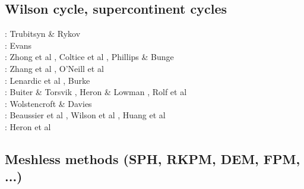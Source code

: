 \subsection{Wilson cycle, supercontinent cycles}

\begin{scriptsize}
\nineteenninetyfive: Trubitsyn \& Rykov \cite{trry95}\\
\twothousandthree: Evans \cite{evan03}\\
\twothousandseven: Zhong et al \cite{zhzl07}, Coltice et al \cite{copb07}, Phillips \& Bunge \cite{phbu07}\\
\twothousandnine: Zhang et al \cite{zhzm09}, O'Neill et al \cite{onlj09}\\
\twothousandeleven: Lenardic et al \cite{lemj11}, Burke \cite{burk11}\\
\twothousandfourteen: Buiter \& Torsvik \cite{buto14}, Heron \& Lowman \cite{helo14}, Rolf et al \cite{roct14}\\
\twothousandseventeen: Wolstencroft \& Davies \cite{woda17}\\
\twothousandnineteen: Beaussier et al \cite{begb19}, Wilson et al \cite{wihb19}, Huang et al \cite{huzl19}\\
\twothousandtwenty: Heron et al \cite{hemn20}
\end{scriptsize}

\subsection{Meshless methods (SPH, RKPM, DEM, FPM, ...)}

